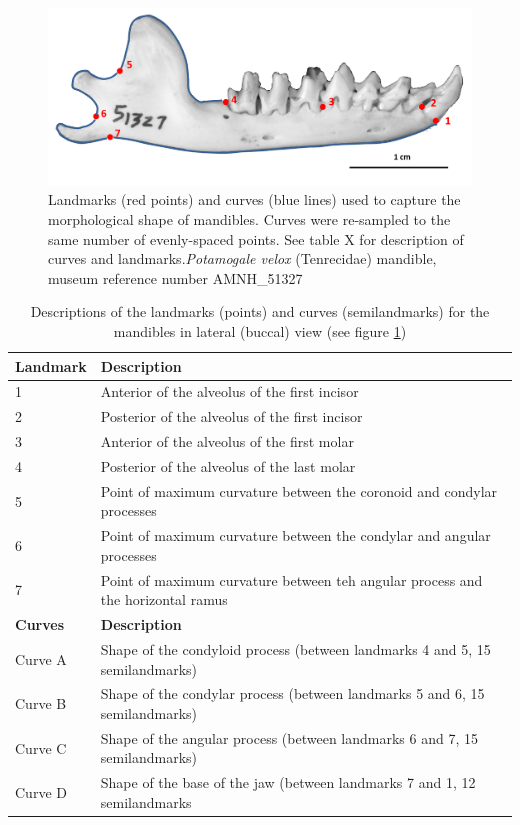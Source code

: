 \documentclass[12pt,a4paper]{article}
\begin{document}
\begin{figure}[H]
\centering
\includegraphics[width=1\linewidth]{AMNH_51327_landmarksdiagram.png}

\caption{Landmarks (red points) and curves (blue lines) used to capture the morphological shape of mandibles. Curves were re-sampled to the same number of evenly-spaced points. See table X for description of curves and landmarks.\textit{Potamogale velox} (Tenrecidae) mandible, museum reference number AMNH\_51327}
\label{mandslandmarks}
\end{figure}


\begin{table}[H]			
\centering
\caption{Descriptions of the landmarks (points) and curves (semilandmarks) for the mandibles in lateral (buccal) view (see figure \ref{mandslandmarks})}
\begin{tabular}[t]{l l}		
\hline
\textbf{Landmark} & \textbf{Description} \\
\hline
1 & Anterior of the alveolus of the first incisor \\
2 & Posterior of the alveolus of the first incisor \\
3 &	Anterior of the alveolus of the first molar \\
4 & Posterior of the alveolus of the last molar \\
5 & Point of maximum curvature between the coronoid and condylar processes \\
6 & Point of maximum curvature between the condylar and angular processes  \\
7 &	Point of maximum curvature between teh angular process and the horizontal ramus \\

\hline
\textbf{Curves} & \textbf{Description}\\
\hline

Curve A & Shape of the condyloid process (between landmarks 4 and 5, 15 semilandmarks) \\
Curve B & Shape of the condylar process (between landmarks 5 and 6, 15 semilandmarks) \\
Curve C & Shape of the angular process (between landmarks 6 and 7, 15 semilandmarks) \\
Curve D & Shape of the base of the jaw (between landmarks 7 and 1, 12 semilandmarks \\
\hline
\end{tabular}
\label{mandslanddesc} %
\end{table}
 
\end{document}
